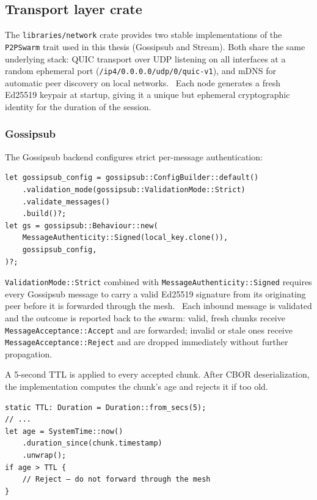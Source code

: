 \subsection{Transport layer crate}
\label{sec:network_crate}
The \texttt{libraries/network} crate provides two stable implementations of the \texttt{P2PSwarm} trait used in this thesis (Gossipsub and Stream).
Both share the same underlying stack: \ac{QUIC} transport over UDP listening on all interfaces at a random ephemeral port (\texttt{/ip4/0.0.0.0/udp/0/quic-v1}), and mDNS for automatic peer discovery on local networks.~\cite{cheshireMulticastDNS2013}
Each node generates a fresh Ed25519 keypair at startup, giving it a unique but ephemeral cryptographic identity for the duration of the session.~\cite{josefssonEdwardsCurveDigitalSignature2017}

\subsubsection{Gossipsub}
The Gossipsub backend configures strict per-message authentication:

\begin{Verbatim}[samepage=true]
let gossipsub_config = gossipsub::ConfigBuilder::default()
    .validation_mode(gossipsub::ValidationMode::Strict)
    .validate_messages()
    .build()?;
let gs = gossipsub::Behaviour::new(
    MessageAuthenticity::Signed(local_key.clone()),
    gossipsub_config,
)?;
\end{Verbatim}

\texttt{ValidationMode::Strict} combined with \texttt{MessageAuthenticity::Signed} requires every Gossipsub message to carry a valid Ed25519 signature from its originating peer before it is forwarded through the mesh.~\cite{josefssonEdwardsCurveDigitalSignature2017}
Each inbound message is validated and the outcome is reported back to the swarm: valid, fresh chunks receive \texttt{MessageAcceptance::Accept} and are forwarded; invalid or stale ones receive \texttt{MessageAcceptance::Reject} and are dropped immediately without further propagation.

A 5-second TTL is applied to every accepted chunk. After CBOR deserialization, the implementation computes the chunk's age and rejects it if too old.~\cite{bormannConciseBinaryObject2020}

\begin{Verbatim}[samepage=true]
static TTL: Duration = Duration::from_secs(5);
// ...
let age = SystemTime::now()
    .duration_since(chunk.timestamp)
    .unwrap();
if age > TTL {
    // Reject — do not forward through the mesh
}
\end{Verbatim}

